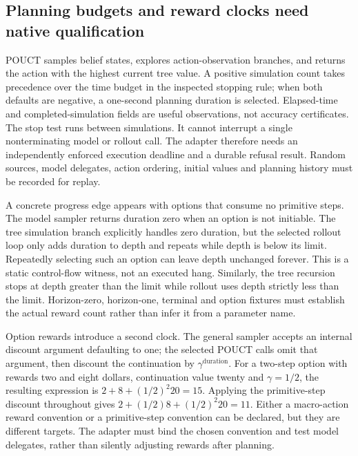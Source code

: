 \subsection{Planning budgets and reward clocks need native qualification}
\label{exec23:pomdppy-planning}
POUCT samples belief states, explores action-observation branches, and returns
the action with the highest current tree value. A positive simulation count
takes precedence over the time budget in the inspected stopping rule; when
both defaults are negative, a one-second planning duration is selected.
Elapsed-time and completed-simulation fields are useful observations, not
accuracy certificates. The stop test runs between simulations. It cannot
interrupt a single nonterminating model or rollout call. The adapter therefore
needs an independently enforced execution deadline and a durable refusal result.
Random sources, model delegates, action ordering, initial values and planning
history must be recorded for replay. \citep{exec23_pomdppy_sources}

A concrete progress edge appears with options that consume no primitive steps.
The model sampler returns duration zero when an option is not initiable.
The tree simulation branch explicitly handles zero duration, but the selected
rollout loop only adds duration to depth and repeats while depth is below its
limit. Repeatedly selecting such an option can leave depth unchanged forever.
This is a static control-flow witness, not an executed hang. Similarly, the
tree recursion stops at depth greater than the limit while rollout uses depth
strictly less than the limit. Horizon-zero, horizon-one, terminal and option
fixtures must establish the actual reward count rather than infer it from a
parameter name. \citep{exec23_pomdppy_sources,exec23_pomdppy_reference}

Option rewards introduce a second clock. The general sampler accepts an
internal discount argument defaulting to one; the selected POUCT calls omit
that argument, then discount the continuation by $\gamma^{\text{duration}}$.
For a two-step option with rewards two and eight dollars, continuation value
twenty and $\gamma=1/2$, the resulting expression is $2+8+(1/2)^2 20=15$.
Applying the primitive-step discount throughout gives
$2+(1/2)8+(1/2)^2 20=11$. Either a macro-action reward convention or a
primitive-step convention can be declared, but they are different targets.
The adapter must bind the chosen convention and test model delegates, rather
than silently adjusting rewards after planning.
\citep{exec23_pomdppy_sources,exec23_pomdppy_reference}


